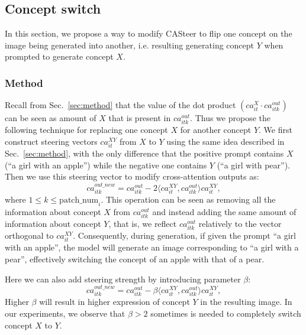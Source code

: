 \subsection{Concept switch}

In this section, we propose a way to modify CASteer to flip one concept on the image being generated into another, i.e. resulting generating concept $Y$ when prompted to generate concept $X$. 

\subsubsection{Method}
Recall from Sec.~\ref{sec:method} that the value of the dot product $(ca^{X}_{it} \cdot ca^{out}_{itk})$ can be seen as amount of $X$ that is present in $ca^{out}_{itk}$. Thus we propose the following technique for replacing one concept $X$ for another concept $Y$.
%
We first construct steering vectors $ca^{XY}_{it}$ from $X$ to $Y$ using the same idea described in Sec.~\ref{sec:method}, with the only difference that the positive prompt contains $X$ (``a girl with an apple'') while the negative one contains $Y$ (``a girl with pear'').
%
Then we use this steering vector to modify cross-attention outputs as:
\begin{equation}
\label{eq:flipping}
ca^{out\_new}_{itk} = ca^{out}_{itk}- 2 \langle ca^{XY}_{it},  ca^{out}_{itk} \rangle ca^{XY}_{it},
\end{equation}
\noindent where
$1 \leqslant k \leqslant \text{patch\_num}_i$. This operation can be seen as removing all the information about concept $X$ from $ca^{out}_{itk}$ and instead adding the same amount of information about concept $Y$, that is, we reflect $ca^{out}_{itk}$ relatively to the vector orthogonal to $ca^{XY}_{it}$.
Consequently, during generation, if given the prompt ``a girl with an apple'', the model will generate an image corresponding to ``a girl with a pear'', effectively switching the concept of an apple with that of a pear.

Here we can also add steering strength by introducing parameter $\beta$:
\begin{equation}
\label{eq:flipping_beta}
ca^{out\_new}_{itk} = ca^{out}_{itk}- \beta \langle ca^{XY}_{it},  ca^{out}_{itk} \rangle ca^{XY}_{it},
\end{equation}
Higher $\beta$ will result in higher expression of concept $Y$ in the resulting image. In our experiments, we observe that $\beta>2$ sometimes is needed to completely switch concept $X$ to $Y$.

